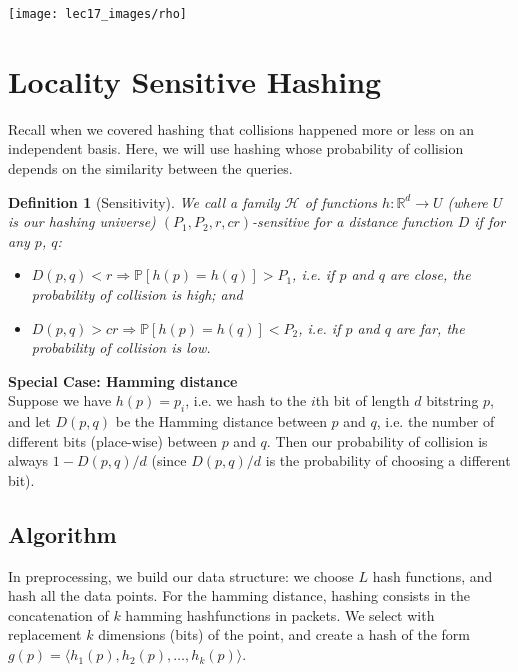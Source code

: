 \documentclass[11pt]{article}
\newtheorem{definition}[theorem]{Definition}
\begin{document}
\begin{center}
    \texttt{[image: lec17\_images/rho]}
\end{center}


\section{Locality Sensitive Hashing}


Recall when we covered hashing that collisions happened more or less on an independent basis. Here, we will use hashing whose probability of collision depends on the similarity between the queries.

\begin{definition}[Sensitivity]
    We call a family $\mathcal{H}$ of functions $h : \mathbb{R}^d \rightarrow U$ (where $U$ is our hashing universe) \emph{$(P_1, P_2, r, cr)$-sensitive} for a distance function $D$ if for any $p$, $q$:
        \begin{itemize}
            \item $D(p,q) < r \Rightarrow \mathbb{P}[h(p) = h(q)] > P_1$, i.e. if $p$ and $q$ are close, the probability of collision is high; and
            \item $D(p,q) > cr \Rightarrow \mathbb{P}[h(p) = h(q)] < P_2$, i.e. if $p$ and $q$ are far, the probability of collision is low.
        \end{itemize}
\end{definition}

\textbf{Special Case: Hamming distance}\\
Suppose we have $h(p) = p_i$, i.e. we hash to the $i$th bit of length $d$ bitstring $p$, and let $D(p,q)$ be the Hamming distance between $p$ and $q$, i.e. the number of different bits (place-wise) between $p$ and $q$. Then our probability of collision is always $1 - D(p,q)/d$ (since $D(p,q)/d$ is the probability of choosing a different bit).



\subsection{Algorithm}

In preprocessing, we build our data structure: we choose $L$ hash functions, and hash all the data points. For the hamming distance, hashing consists in the concatenation of $k$ hamming hashfunctions in packets. We select with replacement $k$ dimensions (bits) of the point, and create a hash of the form $g(p) = \langle h_1(p), h_2(p), \ldots, h_k(p) \rangle$.
\end{document}
